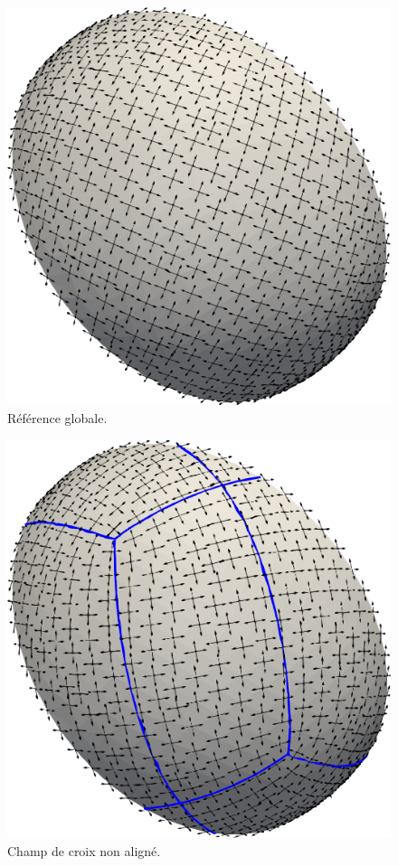 \begin{figure}[!h]
\centering
\includegraphics[scale=0.4]{images/frame.png}
\caption{Référence globale.}
\label{globalframe}
\end{figure}

\begin{figure}[!h]
\centering
\includegraphics[scale=0.38]{images/nonalign.png}
\caption{Champ de croix non aligné.}
\label{nonalign}
\end{figure}

